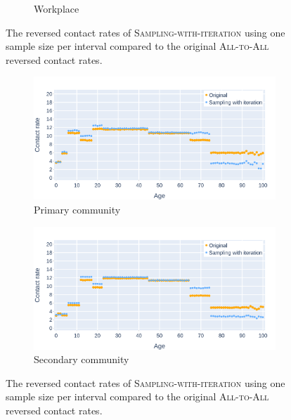 \begin{figure}
\begin{subfigure}{.8\linewidth}
        \caption{Workplace}
        \label{fig:swi_1sample_vs_standard_reversed_cr_workplace}
    \end{subfigure}
    \caption{The reversed contact rates of \textsc{Sampling-with-iteration} using one sample size per interval compared to the original \textsc{All-to-All} reversed contact rates.}
\end{figure}
\begin{figure}\ContinuedFloat
    \centering
    \begin{subfigure}{.8\linewidth}
        \centering
        \includegraphics[width=\textwidth]{4 - Sampling/fig/sampling_with_iteration/swi_1sample_vs_standard_reverse_cr_primary.png}
        \caption{Primary community}
        \label{fig:swi_1sample_vs_standard_reversed_cr_primary}
    \end{subfigure}
    \begin{subfigure}{.8\linewidth}
        \centering
        \includegraphics[width=\textwidth]{4 - Sampling/fig/sampling_with_iteration/swi_1sample_vs_standard_reverse_cr_secondary.png}
        \caption{Secondary community}
        \label{fig:swi_1sample_vs_standard_reversed_cr_secondary}
    \end{subfigure}
    \caption{The reversed contact rates of \textsc{Sampling-with-iteration} using one sample size per interval compared to the original \textsc{All-to-All} reversed contact rates.}
    \label{fig:swi_1sample_vs_standard_reversed_cr}
\end{figure}

